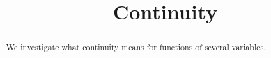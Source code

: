 \documentclass{ximera}
\title[Dig-In:]{Continuity}
\begin{document}
\begin{abstract}
We investigate what continuity means for functions of several variables.
\end{abstract}
\maketitle
\end{document}
